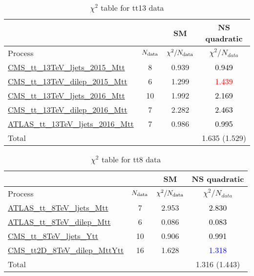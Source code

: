 \documentclass{article}
\begin{document}
\begin{table}[H]
\centering
\begin{tabular}{|l|c|c|c|}
\hline
 \multicolumn{2}{|c|}{} & SM& NS quadratic\\ \hline
Process & $N_{\rm data}$ & $\chi^ 2/N_{\rm data}$& $\chi^ 2/N_{data}$\\ \hline
\href{https://arxiv.org/abs/1610.04191}{CMS_tt_13TeV_ljets_2015_Mtt} & 8 & 0.939 & \textcolor{black}{0.949} \\ \hline
\href{https://arxiv.org/abs/1708.07638}{CMS_tt_13TeV_dilep_2015_Mtt} & 6 & 1.299 & \textcolor{red}{1.439} \\ \hline
\href{https://arxiv.org/abs/1803.08856}{CMS_tt_13TeV_ljets_2016_Mtt} & 10 & 1.992 & \textcolor{black}{2.169} \\ \hline
\href{https://arxiv.org/abs/1811.06625}{CMS_tt_13TeV_dilep_2016_Mtt} & 7 & 2.282 & \textcolor{black}{2.463} \\ \hline
\href{https://arxiv.org/abs/1908.07305}{ATLAS_tt_13TeV_ljets_2016_Mtt} & 7 & 0.986 & \textcolor{black}{0.995} \\ \hline
\hline Total & &  & 1.635 (1.529) \\ \hline
\end{tabular}
\caption{$\chi^2$ table for tt13 data}
\end{table}
\begin{table}[H]
\centering
\begin{tabular}{|l|c|c|c|}
\hline
 \multicolumn{2}{|c|}{} & SM& NS quadratic\\ \hline
Process & $N_{\rm data}$ & $\chi^ 2/N_{\rm data}$& $\chi^ 2/N_{data}$\\ \hline
\href{https://arxiv.org/abs/1511.04716}{ATLAS_tt_8TeV_ljets_Mtt} & 7 & 2.953 & \textcolor{black}{2.830} \\ \hline
\href{https://arxiv.org/abs/1607.07281}{ATLAS_tt_8TeV_dilep_Mtt} & 6 & 0.086 & \textcolor{black}{0.083} \\ \hline
\href{https://arxiv.org/abs/1505.04480}{CMS_tt_8TeV_ljets_Ytt} & 10 & 0.906 & \textcolor{black}{0.991} \\ \hline
\href{https://arxiv.org/abs/1703.01630}{CMS_tt2D_8TeV_dilep_MttYtt} & 16 & 1.628 & \textcolor{blue}{1.318} \\ \hline
\hline Total & &  & 1.316 (1.443) \\ \hline
\end{tabular}
\caption{$\chi^2$ table for tt8 data}
\end{table}
\end{document}
